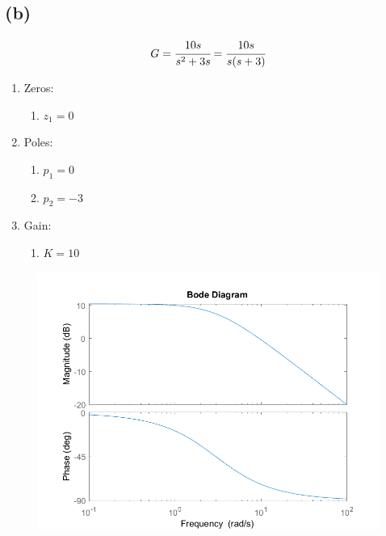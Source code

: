 \documentclass[letter]{article}
\numberwithin{equation}{section}
\begin{document}
\newpage
\subsection{(b)}
\[
	G = \cfrac{
		10 s
	}{
		s^2 + 3s
	}
	= \cfrac{
		10 s
	}{
		s (s + 3)
	}
\]
\begin{enumerate}
	\item Zeros:
	\begin{enumerate}
		\item $z_1 = 0$
	\end{enumerate}
	\item Poles:
	\begin{enumerate}
		\item $p_1 = 0$
		\item $p_2 = -3$
	\end{enumerate}
	\item Gain:
	\begin{enumerate}
		\item $K = 10$
	\end{enumerate}
\end{enumerate}

\begin{figure}[h!]
	\centering
	\includegraphics[width=\textwidth]{figs/pblm2b.png}
\end{figure}


\newpage
\end{document}
